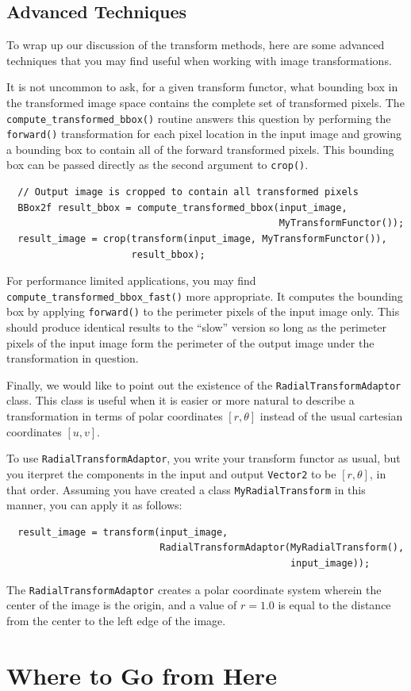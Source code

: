 \subsection{Advanced Techniques}
\label{sec:transform-advanced-techniques}

To wrap up our discussion of the transform methods, here are some
advanced techniques that you may find useful when working with image
transformations.

It is not uncommon to ask, for a given transform functor, what
bounding box in the transformed image space contains the complete set
of transformed pixels.  The \verb#compute_transformed_bbox()# routine
answers this question by performing the \verb#forward()#
transformation for each pixel location in the input image and growing
a bounding box to contain all of the forward transformed pixels.  This
bounding box can be passed directly as the second argument to
\verb#crop()#.

\begin{verbatim} 
  // Output image is cropped to contain all transformed pixels
  BBox2f result_bbox = compute_transformed_bbox(input_image, 
                                                MyTransformFunctor());
  result_image = crop(transform(input_image, MyTransformFunctor()),
                      result_bbox);
\end{verbatim}

For performance limited applications, you may find
\verb#compute_transformed_bbox_fast()# more appropriate.  It computes
the bounding box by applying \verb#forward()# to the perimeter pixels
of the input image only.  This should produce identical results to the
``slow'' version so long as the perimeter pixels of the input
image form the perimeter of the output image under the transformation
in question.

Finally, we would like to point out the existence of the
\verb#RadialTransformAdaptor# class.  This class is useful when it is
easier or more natural to describe a transformation in terms of polar
coordinates $[r,\theta]$ instead of the usual cartesian coordinates
$[u, v]$.

To use \verb#RadialTransformAdaptor#, you write your transform functor
as usual, but you iterpret the components in the input and output
\verb#Vector2# to be $[r,\theta]$, in that order.  Assuming you have
created a class \verb#MyRadialTransform# in this manner, you can apply
it as follows:

\begin{verbatim} 
  result_image = transform(input_image, 
                           RadialTransformAdaptor(MyRadialTransform(),
                                                  input_image));
\end{verbatim}

The \verb#RadialTransformAdaptor# creates a polar coordinate system
wherein the center of the image is the origin, and a value of $r=1.0$ is
equal to the distance from the center to the left edge of the image.



\section{Where to Go from Here}
